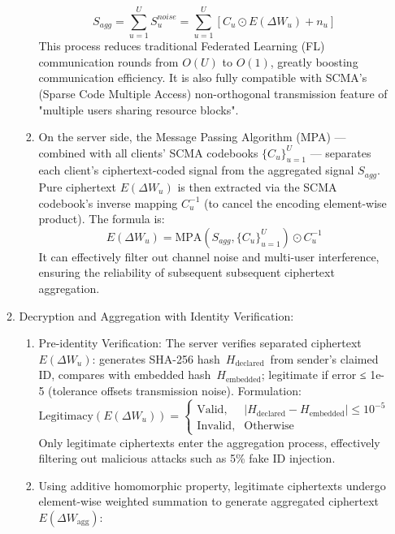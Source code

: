 \documentclass[runningheads]{llncs}
\begin{document}
\begin{enumerate}
\begin{enumerate}
\begin{enumerate}
\begin{equation*}
    S_{agg} = \sum_{u=1}^U S_u^{noise} = \sum_{u=1}^U \left[ C_u \odot E(\Delta W_u) + n_u \right]\tag{12}
\end{equation*}
This process reduces traditional Federated Learning (FL) communication rounds from \(O(U)\) to \(O(1)\), greatly boosting communication efficiency. It is also fully compatible with SCMA’s (Sparse Code Multiple Access) non-orthogonal transmission feature of "multiple users sharing resource blocks".
\item On the server side, the Message Passing Algorithm (MPA) — combined with all clients’ SCMA codebooks \(\{C_u\}_{u=1}^U\) — separates each client’s ciphertext-coded signal from the aggregated signal \(S_{agg}\). Pure ciphertext \(E(\Delta W_u)\) is then extracted via the SCMA codebook’s inverse mapping \(C_u^{-1}\) (to cancel the encoding element-wise product). The formula is:
\begin{equation*}
    E(\Delta W_u) = \text{MPA}(S_{agg}, \{C_u\}_{u=1}^U) \odot C_u^{-1}\tag{13}
\end{equation*}
It can effectively filter out channel noise and multi-user interference, ensuring the reliability of subsequent subsequent ciphertext aggregation.
\end{enumerate}
\item Decryption and Aggregation with Identity Verification:
\begin{enumerate}
\item Pre-identity Verification: The server verifies separated ciphertext \(E(\Delta W_u)\): generates SHA-256 hash \(H_{\text{declared}}\) from sender’s claimed ID, compares with embedded hash \(H_{\text{embedded}}\); legitimate if error ≤ 1e-5 (tolerance offsets transmission noise). Formulation:
\begin{equation*}
\text{Legitimacy}(E(\Delta W_u)) = \begin{cases} 
\text{Valid}, & |H_{\text{declared}} - H_{\text{embedded}}| \leq 10^{-5} \\ 
\text{Invalid}, & \text{Otherwise} 
\end{cases}
\end{equation*}
Only legitimate ciphertexts enter the aggregation process, effectively filtering out malicious attacks such as 5\% fake ID injection.
\item Using additive homomorphic property, legitimate ciphertexts undergo element-wise weighted summation to generate aggregated ciphertext \(E(\Delta W_{\text{agg}})\):


\end{enumerate}
\end{enumerate}
\end{enumerate}
\end{document}
